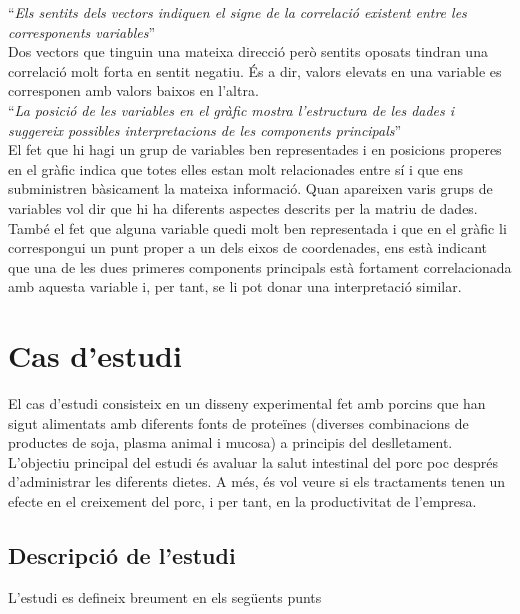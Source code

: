 \documentclass[english]{article}
\begin{document}
``\textit{Els sentits dels vectors indiquen el signe de la correlació existent entre les
corresponents variables}''
\\

Dos vectors que tinguin una mateixa direcció però sentits oposats tindran una correlació
molt forta en sentit negatiu. És a dir, valors elevats en una variable es corresponen amb
valors baixos en l'altra.
\\

``\textit{La posició de les variables en el gràfic mostra l'estructura de les dades i suggereix possibles interpretacions de les components principals}''
\\

El fet que hi hagi un grup de variables ben representades i en posicions properes en el
gràfic indica que totes elles estan molt relacionades entre sí i que ens subministren
bàsicament la mateixa informació. Quan apareixen varis grups de variables vol dir que hi
ha diferents aspectes descrits per la matriu de dades. També el fet que alguna variable quedi molt ben representada i que en el gràfic li correspongui un punt proper a un dels eixos de coordenades, ens està indicant que una de les dues primeres components principals està fortament correlacionada amb aquesta variable i, per tant, se li pot donar una interpretació similar.


\clearpage
\section{Cas d'estudi}
El cas d'estudi consisteix en un disseny experimental fet amb porcins que han sigut alimentats amb diferents fonts de proteïnes (diverses combinacions de productes de soja, plasma animal i mucosa) a principis del deslletament. L'objectiu principal del estudi és avaluar la salut intestinal del porc poc després d'administrar les diferents dietes. A més, és vol veure si els tractaments tenen un efecte en el creixement del porc, i per tant, en la productivitat de l'empresa.
\subsection{Descripció de l'estudi}
L'estudi es defineix breument en els següents punts\\
\end{document}

